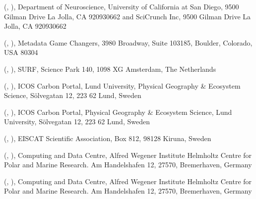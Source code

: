 \documentclass[a4paper,10pt,english]{sphinxmanual}
\begin{document}
\sphinxAtStartPar
{} (, ),
Department of Neuroscience, University of California at San Diego,
9500 Gilman Drive La Jolla, CA 92093\sphinxhyphen{}0662 and SciCrunch Inc, 9500
Gilman Drive La Jolla, CA 92093\sphinxhyphen{}0662

\sphinxAtStartPar
{} (, ),
Metadata Game Changers, 3980 Broadway, Suite 103\sphinxhyphen{}185, Boulder,
Colorado, USA 80304

\sphinxAtStartPar
{} (, ),
SURF, Science Park 140, 1098 XG Amsterdam, The Netherlands

\sphinxAtStartPar
{} (, ),
ICOS Carbon Portal, Lund University, Physical Geography \& Ecosystem
Science, Sölvegatan 12, 223 62 Lund, Sweden

\sphinxAtStartPar
{} (, ),
ICOS Carbon Portal, Physical Geography \& Ecosystem Science, Lund
University, Sölvegatan 12, 223 62 Lund, Sweden

\sphinxAtStartPar
{} (, ),
EISCAT Scientific Association, Box 812, 98128 Kiruna, Sweden

\sphinxAtStartPar
{} (, ),
Computing and Data Centre, Alfred Wegener Institute Helmholtz Centre for
Polar and Marine Research. Am Handelshafen 12, 27570, Bremerhaven,
Germany

\sphinxAtStartPar
{} (, ),
Computing and Data Centre, Alfred Wegener Institute Helmholtz Centre for
Polar and Marine Research. Am Handelshafen 12, 27570, Bremerhaven,
Germany
\end{document}
